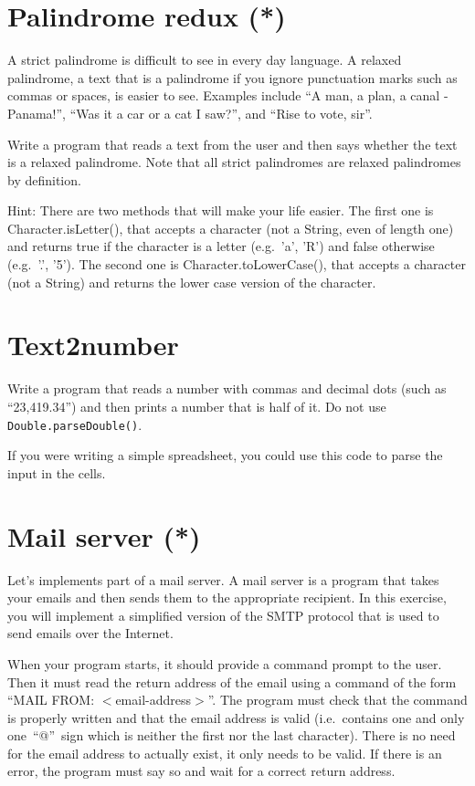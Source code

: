 \documentclass{article}
\begin{document}
\section{Palindrome redux (*)}
\label{sec:palindrome-redux}

A strict palindrome is difficult to see in every day language. A
relaxed palindrome, a text that is a palindrome if you ignore
punctuation marks such as commas or spaces, is easier to see. Examples
include ``A man, a plan, a canal - Panama!'', ``Was it a car or a cat
I saw?'', and ``Rise to vote, sir''. 

Write a program that reads a text from the user and then says whether
the text is a relaxed palindrome. Note that all strict palindromes are
relaxed palindromes by definition. 

Hint: There are two methods that will make your life easier. The first
one is Character.isLetter(), that accepts a character (not a String,
even of length one) and returns true if the character is a letter
(e.g.~'a', 'R') and false otherwise (e.g.~'.', '5'). The second one is
Character.toLowerCase(), that accepts a character (not a String) and
returns the lower case version of the character. 

\section{Text2number}
\label{sec:text2number}

Write a program that reads a number with commas and decimal dots (such
as ``23,419.34'') and then prints a number that is half of it. Do not
use \verb+Double.parseDouble()+. 

If you were writing a simple spreadsheet, you could use this code to
parse the input in the cells. 


\section{Mail server (*)}
\label{sec:mail-server}

Let's implements part of a mail server. A mail server is a program
that takes your emails and then sends them to the appropriate
recipient. In this exercise, you will implement a simplified version
of the SMTP protocol that is used to send emails over the Internet. 

When your program starts, it should provide a command prompt to the
user. Then it must read the return address of the email using a
command of the form ``MAIL FROM: $<$email-address$>$''. The program
must check that the command is properly written and that the email
address is valid (i.e.~contains one and only one~``@''~sign 
which is neither the
first nor the last character). There is no need for the email address
to actually exist, it only needs to be valid. If there is an error,
the program must 
say so and wait for a correct return address.
\end{document}

